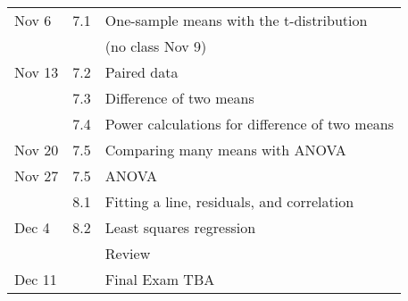 \begin{table}[!ht]
\begin{tabular}{|l|l|l|}
		\hline 
		
Nov 6	  & 7.1    & One-sample means with the t-distribution   \\
 & &  (no class Nov 9)  \\
   \hline
   
	 Nov 13      & 7.2 &  Paired data \\
	      & 7.3 & Difference of two means \\
	      & 7.4    & Power calculations for difference of two means   \\
	      
		\hline 
		
	 
		Nov 20      & 7.5 & Comparing many means with ANOVA \\
		\hline 
		
	 Nov 27	  & 7.5 & ANOVA \\
	 & 8.1   & Fitting a line, residuals, and correlation    \\
		 
		\hline 
		
		
		Dec 4  &  8.2 & Least squares regression     \\
		    & &  Review  \\
		\hline 
		
		Dec 11  &    &  Final Exam TBA  \\
		\hline 
		
	
		
		
		
		
	
	\end{tabular}
\end{table}